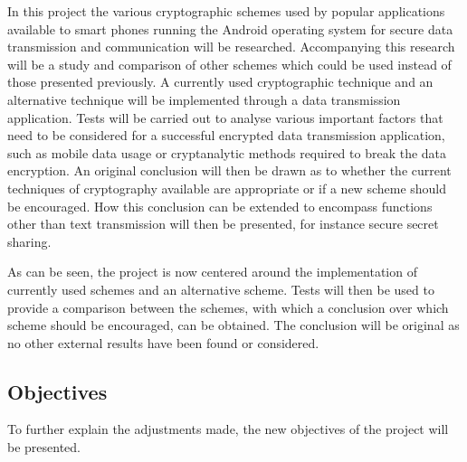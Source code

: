 \documentclass[a4paper,11pt]{article}
\begin{document}
In this project the various cryptographic schemes used by popular applications available to smart phones running the Android operating system for secure data transmission and communication will be researched. Accompanying this research will be a study and comparison of other schemes which could be used instead of those presented previously. A currently used cryptographic technique and an alternative technique will be implemented through a data transmission application. Tests will be carried out to analyse various important factors that need to be considered for a successful encrypted data transmission application, such as mobile data usage or cryptanalytic methods required to break the data encryption. An original conclusion will then be drawn as to whether the current techniques of cryptography available are appropriate or if a new scheme should be encouraged. How this conclusion can be extended to encompass functions other than text transmission will then be presented, for instance secure secret sharing.

As can be seen, the project is now centered around the implementation of currently used schemes and an alternative scheme. Tests will then be used to provide a comparison between the schemes, with which a conclusion over which scheme should be encouraged, can be obtained. The conclusion will be original as no other external results have been found or considered.
 
\subsection{Objectives}

To further explain the adjustments made, the new objectives of the project will be presented.
\end{document}
